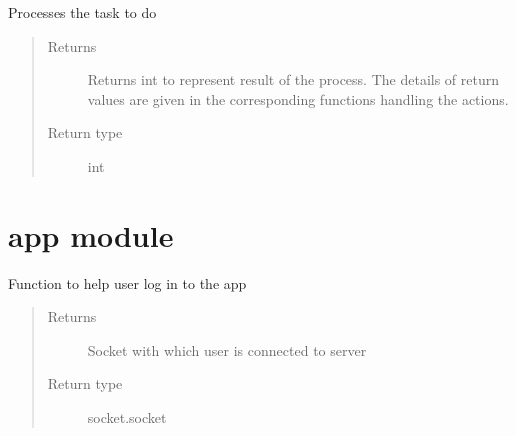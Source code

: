 \documentclass[letterpaper,10pt,english]{sphinxmanual}
\begin{document}
\begin{fulllineitems}
\begin{fulllineitems}
\label{\detokenize{Message:Message.Message.processTask}}
Processes the task to do
\begin{quote}\begin{description}
\item[{Returns}] \leavevmode
Returns int to represent result of the process. The details of return values are given in the corresponding functions handling the actions.

\item[{Return type}] \leavevmode
int

\end{description}\end{quote}

\end{fulllineitems}


\end{fulllineitems}



\section{app module}
\label{\detokenize{app:module-app}}\label{\detokenize{app:app-module}}\label{\detokenize{app::doc}}

\begin{fulllineitems}
\label{\detokenize{app:app.login}}
Function to help user log in to the app
\begin{quote}\begin{description}
\item[{Returns}] \leavevmode
Socket with which user is connected to server

\item[{Return type}] \leavevmode
socket.socket

\end{description}\end{quote}

\end{fulllineitems}

\end{document}
